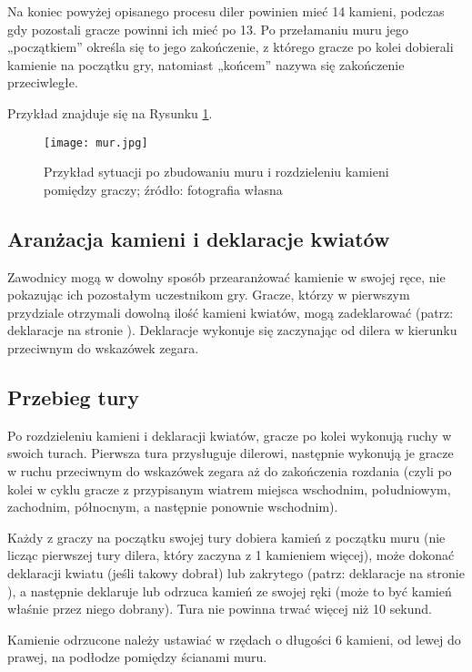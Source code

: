 Na koniec powyżej opisanego procesu diler powinien mieć 14 kamieni, podczas gdy
pozostali gracze powinni ich mieć po 13. Po przełamaniu muru jego „początkiem”
określa się to jego zakończenie, z którego gracze po kolei dobierali kamienie na
początku gry, natomiast „końcem” nazywa się zakończenie przeciwległe.

Przykład znajduje się na Rysunku \ref{fig:mur}.

\begin{figure}[H]
\centering
\texttt{[image: mur.jpg]}
\caption{Przykład sytuacji po zbudowaniu muru i rozdzieleniu kamieni pomiędzy
graczy; źródło: fotografia własna}
\label{fig:mur}
\end{figure}

\subsection{Aranżacja kamieni i deklaracje kwiatów}
Zawodnicy mogą w dowolny sposób przearanżować kamienie w swojej ręce, nie
pokazując ich pozostałym uczestnikom gry. Gracze, którzy w pierwszym przydziale
otrzymali dowolną ilość kamieni kwiatów, mogą zadeklarować  (patrz:
deklaracje na stronie \pageref{deklaracje}). Deklaracje
wykonuje się zaczynając od dilera w kierunku przeciwnym do wskazówek zegara.  
 
\subsection{Przebieg tury}
Po rozdzieleniu kamieni i deklaracji kwiatów,  gracze po kolei wykonują ruchy w
swoich turach. Pierwsza tura przysługuje dilerowi, następnie wykonują je gracze
w ruchu przeciwnym do wskazówek zegara aż do zakończenia rozdania (czyli po
kolei w cyklu gracze z przypisanym wiatrem miejsca wschodnim, południowym,
zachodnim, północnym, a następnie ponownie wschodnim).

Każdy z graczy na początku swojej tury dobiera kamień z początku muru (nie
licząc pierwszej tury dilera, który zaczyna z 1 kamieniem więcej), może dokonać
deklaracji kwiatu (jeśli takowy dobrał) lub zakrytego  (patrz:
deklaracje na stronie \pageref{deklaracje}), a następnie deklaruje 
lub odrzuca kamień ze swojej ręki (może to być kamień właśnie przez niego dobrany). Tura
nie powinna trwać więcej niż 10 sekund.

Kamienie odrzucone należy ustawiać w rzędach o długości 6 kamieni, od lewej do
prawej, na podłodze pomiędzy ścianami muru. 


